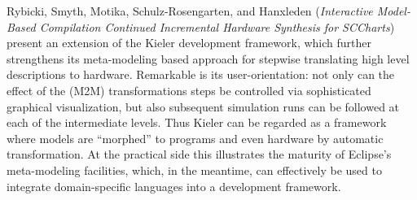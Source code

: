 



Rybicki, Smyth, Motika,
Schulz-Rosengarten, and Hanxleden
\cite{isola-2016-rybicki}
({\em Interactive Model-Based Compilation Continued
Incremental Hardware Synthesis for SCCharts})
present an extension of the Kieler development framework, which further strengthens its meta-modeling based approach for stepwise translating high level descriptions to hardware. Remarkable is its user-orientation: not only can the effect of the (M2M) transformations steps be controlled via sophisticated graphical visualization, but also subsequent simulation runs can be followed at each of the intermediate levels. Thus Kieler can be regarded as a framework where models are ``morphed'' to programs and even hardware  by automatic transformation. 
At the practical side this illustrates the maturity of Eclipse's meta-modeling facilities, which, in the meantime, can effectively be used to integrate domain-specific languages into a development framework.


